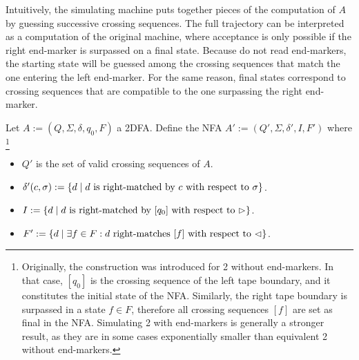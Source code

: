 Intuitively, the simulating machine puts together pieces of the computation of $A$ by guessing successive crossing sequences.
The full trajectory can be interpreted as a computation of the original machine, where acceptance is only possible if the right end-marker is surpassed on a final state.
Because \NFAs{} do not read end-markers, the starting state will be guessed among the crossing sequences that match the one entering the left end-marker.
For the same reason, final states correspond to crossing sequences that are compatible to the one surpassing the right end-marker.

Let $A:=(Q,\Sigma,\delta,q_0,F)$ a 2DFA.
Define the NFA $A':=(Q',\Sigma,\delta',I,F')$ where%
\footnote{
	Originally, the construction was introduced for 2\DFAs{} without end-markers.
	In that case, $[q_0]$ is the crossing sequence of the left tape boundary, and it constitutes the initial state of the NFA.
	Similarly, the right tape boundary is surpassed in a state $f\in F$, therefore all crossing sequences $[f]$ are set as final in the NFA.
	Simulating 2\DFAs{} with end-markers is generally a stronger result, as they are in some cases exponentially smaller than equivalent 2\DFAs{} without end-markers.
}
\begin{itemize}
	\item $Q'$ is the set of valid crossing sequences of $A$.
	\item $\delta'(c,\sigma):=\{d \mid \text{$d$ is right-matched by $c$ with respect to $\sigma$}\}$.
	\item $I:=\{d\mid \text{$d$ is right-matched by $[q_0]$ with respect to $\rhd$}\}$.
	\item $F':=\{d\mid \exists f\in F: \text{$d$ right-matches $[f]$ with respect to $\lhd$}\}$.
\end{itemize}

